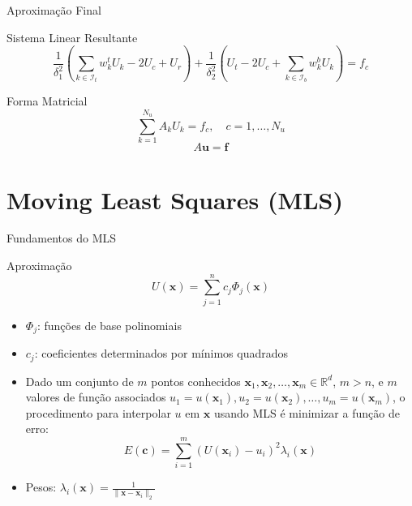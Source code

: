 \documentclass[../main/main.tex]{subfiles}
\begin{document}
\begin{frame}{Aproximação Final}
\begin{block}{Sistema Linear Resultante}
\[
\frac{1}{\delta_1^2}\left(\sum_{k \in \mathcal{I}_t} w_k^t U_k - 2U_c + U_r\right) + \frac{1}{\delta_2^2}\left(U_t - 2U_c + \sum_{k \in \mathcal{I}_b} w_k^b U_k\right) = f_c
\]
\end{block}

\begin{block}{Forma Matricial}
\[
\sum_{k=1}^{N_u} A_k U_k = f_c, \quad c = 1, \ldots, N_u
\]
\[
A\mathbf{u} = \mathbf{f}
\]
\end{block}
\end{frame}

\section{Moving Least Squares (MLS)}

\begin{frame}{Fundamentos do MLS}
\begin{block}{Aproximação}
\[
U(\mathbf{x}) = \sum_{j=1}^n c_j \Phi_j(\mathbf{x})
\]
\end{block}

\begin{itemize}
\item $\Phi_j$: funções de base polinomiais
\item $c_j$: coeficientes determinados por mínimos quadrados
\item Dado um conjunto de $m$ pontos conhecidos
  $\mathbf{x}_{1},\mathbf{x}_{2},\ldots,\mathbf{x}_{m} \in \mathbb{R}^{d}$, $m
  > n$, e $m$ valores de função associados
  $u_{1}=u(\mathbf{x}_{1}),u_{2}=u(\mathbf{x}_{2}),\ldots,u_{m}=u(\mathbf{x}_{m})$,
  o procedimento para interpolar $u$ em $\mathbf{x}$ usando MLS é minimizar a
  função de erro:
\[
E(\mathbf{c}) = \sum_{i=1}^m \left(U(\mathbf{x}_i) - u_i\right)^2 \lambda_i(\mathbf{x})
\]
\item Pesos: $\lambda_i(\mathbf{x}) = \frac{1}{\|\mathbf{x} - \mathbf{x}_i\|_2}$
\end{itemize}
\end{frame}
\end{document}
